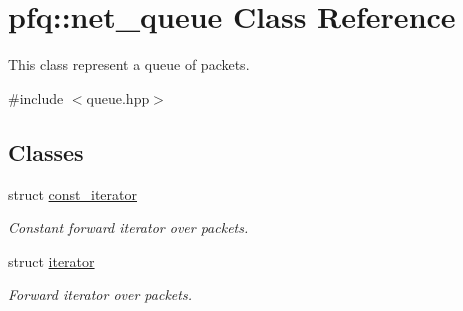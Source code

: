 \hypertarget{classpfq_1_1net__queue}{\section{pfq\+:\+:net\+\_\+queue Class Reference}
\label{classpfq_1_1net__queue}
}


This class represent a queue of packets.  




{\ttfamily \#include $<$queue.\+hpp$>$}

\subsection*{Classes}
\begin{DoxyCompactItemize}
\item 
struct \hyperlink{structpfq_1_1net__queue_1_1const__iterator}{const\+\_\+iterator}
\begin{DoxyCompactList}\small\item\em Constant forward iterator over packets. \end{DoxyCompactList}\item 
struct \hyperlink{structpfq_1_1net__queue_1_1iterator}{iterator}
\begin{DoxyCompactList}\small\item\em Forward iterator over packets. \end{DoxyCompactList}\end{DoxyCompactItemize}
